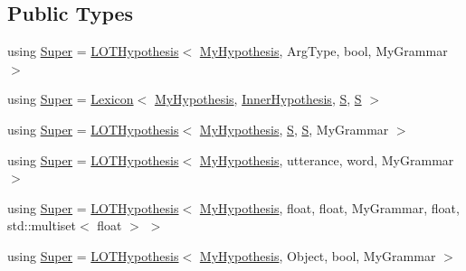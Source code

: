 \subsection*{Public Types}
\begin{DoxyCompactItemize}
\item 
using \hyperlink{class_my_hypothesis_a12e3d952f8fca502912d3bd868fa9f99}{Super} = \hyperlink{class_l_o_t_hypothesis}{L\+O\+T\+Hypothesis}$<$ \hyperlink{class_my_hypothesis}{My\+Hypothesis}, Arg\+Type, bool, My\+Grammar $>$
\item 
using \hyperlink{class_my_hypothesis_a266742f266abc638ddc1d1870d735313}{Super} = \hyperlink{class_lexicon}{Lexicon}$<$ \hyperlink{class_my_hypothesis}{My\+Hypothesis}, \hyperlink{class_inner_hypothesis}{Inner\+Hypothesis}, \hyperlink{_models_2_formal_language_theory-_complex_2_main_8cpp_a51c40915539205f0b5add30b0d68a4cb}{S}, \hyperlink{_models_2_formal_language_theory-_complex_2_main_8cpp_a51c40915539205f0b5add30b0d68a4cb}{S} $>$
\item 
using \hyperlink{class_my_hypothesis_ae5fab2ea7ef7729968ac60a2ce267168}{Super} = \hyperlink{class_l_o_t_hypothesis}{L\+O\+T\+Hypothesis}$<$ \hyperlink{class_my_hypothesis}{My\+Hypothesis}, \hyperlink{_models_2_formal_language_theory-_complex_2_main_8cpp_a51c40915539205f0b5add30b0d68a4cb}{S}, \hyperlink{_models_2_formal_language_theory-_complex_2_main_8cpp_a51c40915539205f0b5add30b0d68a4cb}{S}, My\+Grammar $>$
\item 
using \hyperlink{class_my_hypothesis_a1c1cfa95f1a49b273f8a93b3246342e6}{Super} = \hyperlink{class_l_o_t_hypothesis}{L\+O\+T\+Hypothesis}$<$ \hyperlink{class_my_hypothesis}{My\+Hypothesis}, utterance, word, My\+Grammar $>$
\item 
using \hyperlink{class_my_hypothesis_aebf7eaf0477f8b39639e917bc87d208f}{Super} = \hyperlink{class_l_o_t_hypothesis}{L\+O\+T\+Hypothesis}$<$ \hyperlink{class_my_hypothesis}{My\+Hypothesis}, float, float, My\+Grammar, float, std\+::multiset$<$ float $>$ $>$
\item 
using \hyperlink{class_my_hypothesis_af34a1c11e5b0aae4a52b54bfdd7a0617}{Super} = \hyperlink{class_l_o_t_hypothesis}{L\+O\+T\+Hypothesis}$<$ \hyperlink{class_my_hypothesis}{My\+Hypothesis}, Object, bool, My\+Grammar $>$
\end{DoxyCompactItemize}

